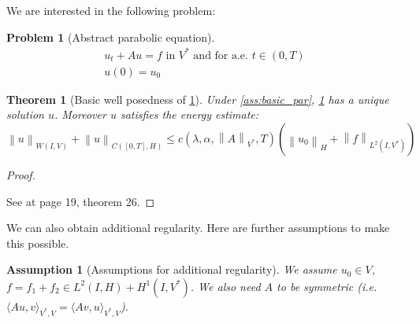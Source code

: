 \documentclass[english,a4paper,12pt,oneside]{scrbook}
\theoremstyle{break}
\newtheorem{thm}[equation]{Theorem}
\newtheorem{ass}[equation]{Assumption}
\newtheorem{pb}[equation]{Problem}
\newenvironment{mproof}[1][\proofname]{%
  \begin{proof}[#1]$ $\par\nobreak\ignorespaces
}{%
  \end{proof}
}
\renewcommand*{\proofname}{Proof}
\theoremstyle{remark}
\newcommand{\norm}[1]{\left\lVert#1\right\rVert}
\newcommand{\HN}[1]{\norm{#1}_{H}}
\newcommand{\VSN}[1]{\norm{#1}_{V^*}}
\begin{document}
We are interested in the following problem:

\begin{pb}[Abstract parabolic equation]
\label{eqn:general_parabolic}
\begin{align}
	u_t+Au=f \text{ in }V^* \text{ and for a.e. } t \in (0,T)\\
	u(0)=u_0
\end{align}
\end{pb}

\begin{thm}[Basic well posedness of \cref{eqn:general_parabolic}]
\label{thm:well_pos_parabolic}
Under \cref{ass:basic_par}, \cref{eqn:general_parabolic} has a unique solution $u$. Moreover $u$ satisfies the energy estimate:
\begin{equation}
	\label{eqn:en_est}
	\norm{u}_{W(I,V)} + \norm{u}_{C([0,T],H)}\leq c(\lambda, \alpha, \VSN{A}, T)(\HN{u_0}+\norm{f}_{L^2(I,V^*)})
\end{equation} 
\end{thm}
\begin{mproof}
See \cite{gilardi} at page 19, theorem 26.
\end{mproof}

We can also obtain additional regularity. Here are further assumptions to make this possible.

\begin{ass}[Assumptions for additional regularity]
\label{ass:reg_par}
We assume $u_0 \in V$, $f = f_1+f_2 \in L^2(I,H)+H^1(I,V^*)$. We also need $A$ to be symmetric (i.e. $\langle Au,v \rangle_{V^*,V} = \langle Av,u \rangle_{V^*,V}$).
\end{ass}
\end{document}
